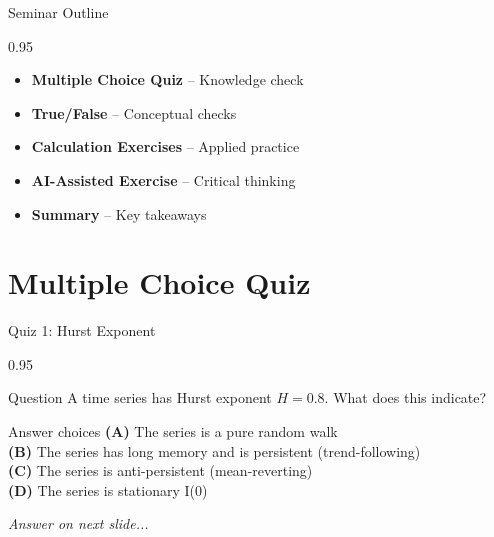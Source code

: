 \documentclass[9pt, aspectratio=169, t]{beamer}
\subtitle{Seminar 8: Modern Extensions}
\begin{document}
{
\begin{frame}
    \titlepage
\end{frame}
}


\begin{frame}{Seminar Outline}
    \begin{cminipage}{0.95\textwidth}
    \begin{itemize}
        \item \textbf{Multiple Choice Quiz} -- Knowledge check
        \vspace{0.15cm}
        \item \textbf{True/False} -- Conceptual checks
        \vspace{0.15cm}
        \item \textbf{Calculation Exercises} -- Applied practice
        \vspace{0.15cm}
        \item \textbf{AI-Assisted Exercise} -- Critical thinking
        \vspace{0.15cm}
        \item \textbf{Summary} -- Key takeaways
    \end{itemize}
    \end{cminipage}
\end{frame}

\section{Multiple Choice Quiz}

\begin{frame}{Quiz 1: Hurst Exponent}
    \begin{cminipage}{0.95\textwidth}
    \begin{alertblock}{Question}
        A time series has Hurst exponent $H = 0.8$. What does this indicate?
    \end{alertblock}

    \vspace{0.4cm}

    \begin{block}{Answer choices}
        \textcolor{MainBlue}{\textbf{(A)}} The series is a pure random walk\\[3pt]
        \textcolor{MainBlue}{\textbf{(B)}} The series has long memory and is persistent (trend-following)\\[3pt]
        \textcolor{MainBlue}{\textbf{(C)}} The series is anti-persistent (mean-reverting)\\[3pt]
        \textcolor{MainBlue}{\textbf{(D)}} The series is stationary I(0)
    \end{block}

    \vspace{0.5cm}

    \begin{center}
        \textit{Answer on next slide...}
    \end{center}
    \end{cminipage}
\end{frame}
\end{document}
